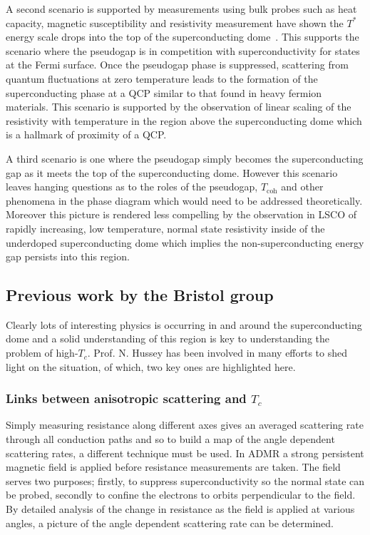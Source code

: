 A second scenario is supported by measurements using bulk probes such as heat capacity, magnetic susceptibility and resistivity measurement have shown the $T^*$ energy scale drops into the top of the superconducting dome~\cite{Tallon2001}. This supports the scenario where the pseudogap is in competition with superconductivity for states at the Fermi surface. Once the pseudogap phase is suppressed, scattering from quantum fluctuations at zero temperature leads to the formation of the superconducting phase at a \ac{QCP} similar to that found in heavy fermion materials. This scenario is supported by the observation of linear scaling of the resistivity with temperature in the region above the superconducting dome which is a hallmark of proximity of a \ac{QCP}.

A third scenario is one where the pseudogap simply becomes the superconducting gap as it meets the top of the superconducting dome. However this scenario leaves hanging questions as to the roles of the pseudogap, $T_{\textrm{coh}}$ and other phenomena in the phase diagram which would need to be addressed theoretically. Moreover this picture is rendered less compelling by the observation in \ac{LSCO} of rapidly increasing, low temperature, normal state resistivity inside of the underdoped superconducting dome which implies the non-superconducting energy gap persists into this region.


\subsection{Previous work by the Bristol group}

Clearly lots of interesting physics is occurring in and around the superconducting dome and a solid understanding of this region is key to understanding the problem of high-$T_c$. Prof. N. Hussey has been involved in many efforts to shed light on the situation, of which, two key ones are highlighted here.

\subsubsection{Links between anisotropic scattering and $T_c$}

Simply measuring resistance along different axes gives an averaged scattering rate through all conduction paths and so to build a map of the angle dependent scattering rates, a different technique must be used. In \ac{ADMR} a strong persistent magnetic field is applied before resistance measurements are taken. The field serves two purposes; firstly, to suppress superconductivity so the normal state can be probed, secondly to confine the electrons to orbits perpendicular to the field. By detailed analysis of the change in resistance as the field is applied at various angles, a picture of the angle dependent scattering rate can be determined.

